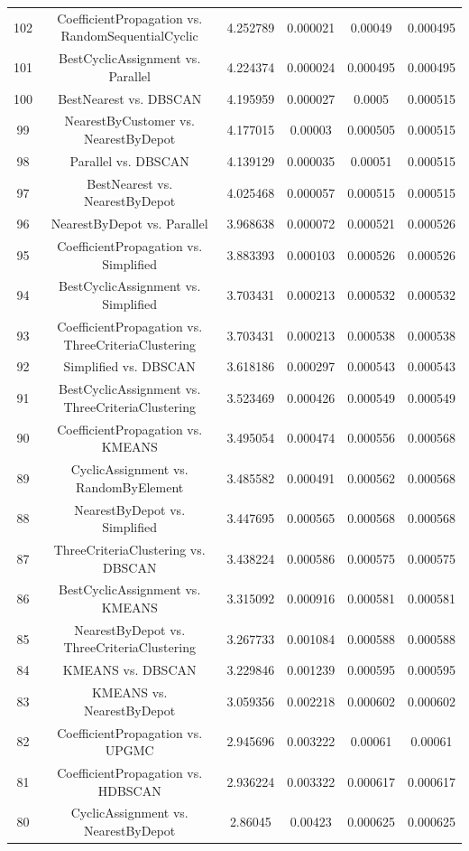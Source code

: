 \documentclass[a4paper,10pt]{article}
\begin{document}
\begin{landscape}
\begin{table}[!htp]
\begin{tabular}{cccccc}
102&CoefficientPropagation vs. RandomSequentialCyclic&4.252789&0.000021&0.00049&0.000495\\
101&BestCyclicAssignment vs. Parallel&4.224374&0.000024&0.000495&0.000495\\
100&BestNearest vs. DBSCAN&4.195959&0.000027&0.0005&0.000515\\
99&NearestByCustomer vs. NearestByDepot&4.177015&0.00003&0.000505&0.000515\\
98&Parallel vs. DBSCAN&4.139129&0.000035&0.00051&0.000515\\
97&BestNearest vs. NearestByDepot&4.025468&0.000057&0.000515&0.000515\\
96&NearestByDepot vs. Parallel&3.968638&0.000072&0.000521&0.000526\\
95&CoefficientPropagation vs. Simplified&3.883393&0.000103&0.000526&0.000526\\
94&BestCyclicAssignment vs. Simplified&3.703431&0.000213&0.000532&0.000532\\
93&CoefficientPropagation vs. ThreeCriteriaClustering&3.703431&0.000213&0.000538&0.000538\\
92&Simplified vs. DBSCAN&3.618186&0.000297&0.000543&0.000543\\
91&BestCyclicAssignment vs. ThreeCriteriaClustering&3.523469&0.000426&0.000549&0.000549\\
90&CoefficientPropagation vs. KMEANS&3.495054&0.000474&0.000556&0.000568\\
89&CyclicAssignment vs. RandomByElement&3.485582&0.000491&0.000562&0.000568\\
88&NearestByDepot vs. Simplified&3.447695&0.000565&0.000568&0.000568\\
87&ThreeCriteriaClustering vs. DBSCAN&3.438224&0.000586&0.000575&0.000575\\
86&BestCyclicAssignment vs. KMEANS&3.315092&0.000916&0.000581&0.000581\\
85&NearestByDepot vs. ThreeCriteriaClustering&3.267733&0.001084&0.000588&0.000588\\
84&KMEANS vs. DBSCAN&3.229846&0.001239&0.000595&0.000595\\
83&KMEANS vs. NearestByDepot&3.059356&0.002218&0.000602&0.000602\\
82&CoefficientPropagation vs. UPGMC&2.945696&0.003222&0.00061&0.00061\\
81&CoefficientPropagation vs. HDBSCAN&2.936224&0.003322&0.000617&0.000617\\
80&CyclicAssignment vs. NearestByDepot&2.86045&0.00423&0.000625&0.000625\\

\end{tabular}
\end{table}
\end{landscape}
\end{document}
